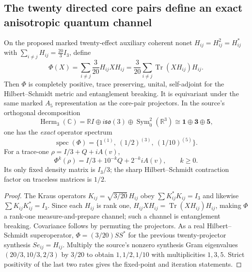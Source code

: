 \documentclass[12pt,a4paper]{article}
\begin{document}
\subsection{The twenty directed core pairs define an exact anisotropic quantum channel}
\label{p4b:sec:cc17-nonet-luders-semigroup}
\begin{theorem}
\label{p4b:thm:cc17-directed-nonet-luders}
On the proposed marked twenty-effect auxiliary coherent nonet
$H_{ij}=H_{ij}^2=H_{ij}^*$ with
$\sum_{i\ne j}H_{ij}=\frac{20}{3}I_3$, define
\[
\boxed{\Phi(X)=\sum_{i\ne j}\frac3{20}H_{ij}XH_{ij}
 =\frac3{20}\sum_{i\ne j}\operatorname{Tr}(XH_{ij})H_{ij}.}
\]
Then $\Phi$ is completely positive, trace preserving, unital,
self-adjoint for the Hilbert--Schmidt metric and
entanglement breaking. It is equivariant under the same marked
$A_5$ representation as the core-pair projectors.
In the source's orthogonal decomposition
\[\operatorname{Herm}_3(\mathbb C)
 =\mathbb RI\oplus i\mathfrak{so}(3)\oplus\operatorname{Sym}^2_0(\mathbb R^3)
 \cong\mathbf1\oplus\mathbf3\oplus\mathbf5,\]
one has the \emph{exact} operator spectrum
\[\boxed{\operatorname{spec}(\Phi)=
\{1^{(1)},\ (1/2)^{(3)},\ (1/10)^{(5)}\}.}\]
For a trace-one $\rho=I/3+Q+iA(v)$,
\[\boxed{\Phi^k(\rho)=I/3+10^{-k}Q+2^{-k}iA(v),\qquad k\ge0.}\]
Its only fixed density matrix is $I_3/3$; the sharp
Hilbert--Schmidt contraction factor on traceless matrices is $1/2$.
\end{theorem}
\begin{proof}
The Kraus operators $K_{ij}=\sqrt{3/20}\,H_{ij}$ obey
$\sum K_{ij}^*K_{ij}=I_3$ and likewise
$\sum K_{ij}K_{ij}^*=I_3$. Since each $H_{ij}$ is rank one,
$H_{ij}XH_{ij}=\operatorname{Tr}(XH_{ij})H_{ij}$, making
$\Phi$ a rank-one measure-and-prepare channel; such a channel
is entanglement breaking. Covariance follows by permuting the
projectors. As a real Hilbert--Schmidt superoperator,
$\Phi=(3/20)SS^*$ for the previous twenty-projector synthesis
$Se_{ij}=H_{ij}$. Multiply the source's nonzero synthesis Gram
eigenvalues $(20/3,10/3,2/3)$ by $3/20$ to obtain
$1,1/2,1/10$ with multiplicities $1,3,5$.
Strict positivity of the last two rates gives the fixed-point
and iteration statements.
\end{proof}
\end{document}
